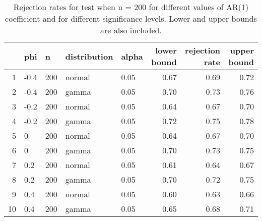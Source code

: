 \begin{table}[ht]
\centering
\caption{Rejection rates for test when n = 200 for 
                   different values of AR(1) coefficient and for different 
                   significance levels. Lower and upper bounds are also 
                   included.} 
\label{table:rr_200}
\begin{tabular}{rllllrrr}
  \hline
 & phi & n & distribution & alpha & lower bound & rejection rate & upper bound \\ 
  \hline
1 & -0.4 & 200 & normal & 0.05 & 0.67 & 0.69 & 0.72 \\ 
  2 & -0.4 & 200 & gamma & 0.05 & 0.70 & 0.73 & 0.76 \\ 
  3 & -0.2 & 200 & normal & 0.05 & 0.64 & 0.67 & 0.70 \\ 
  4 & -0.2 & 200 & gamma & 0.05 & 0.72 & 0.75 & 0.78 \\ 
  5 & 0 & 200 & normal & 0.05 & 0.64 & 0.67 & 0.70 \\ 
  6 & 0 & 200 & gamma & 0.05 & 0.70 & 0.73 & 0.75 \\ 
  7 & 0.2 & 200 & normal & 0.05 & 0.61 & 0.64 & 0.67 \\ 
  8 & 0.2 & 200 & gamma & 0.05 & 0.70 & 0.72 & 0.75 \\ 
  9 & 0.4 & 200 & normal & 0.05 & 0.60 & 0.63 & 0.66 \\ 
  10 & 0.4 & 200 & gamma & 0.05 & 0.65 & 0.68 & 0.71 \\ 
   \hline
\end{tabular}
\end{table}

